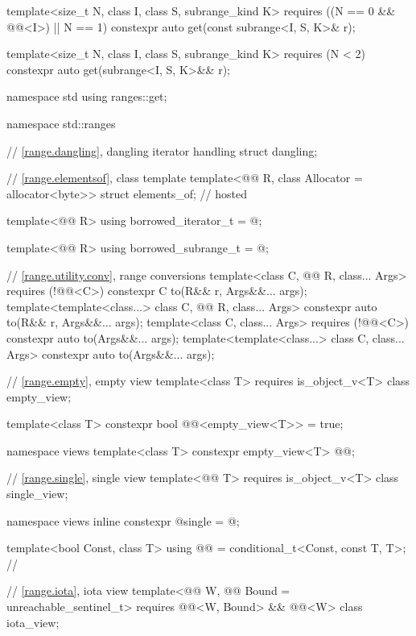 \begin{codeblock}
{  template<size_t N, class I, class S, subrange_kind K>
    requires ((N == 0 && @@<I>) || N == 1)
    constexpr auto get(const subrange<I, S, K>& r);

  template<size_t N, class I, class S, subrange_kind K>
    requires (N < 2)
    constexpr auto get(subrange<I, S, K>&& r);
}

namespace std {
  using ranges::get;
}

namespace std::ranges {
  // \ref{range.dangling}, dangling iterator handling
  struct dangling;

  // \ref{range.elementsof}, class template 
  template<@@ R, class Allocator = allocator<byte>>
    struct elements_of;                                                             // hosted

  template<@@ R>
    using borrowed_iterator_t = @\seebelow@;

  template<@@ R>
    using borrowed_subrange_t = @\seebelow@;

  // \ref{range.utility.conv}, range conversions
  template<class C, @@ R, class... Args> requires (!@@<C>)
    constexpr C to(R&& r, Args&&... args);
  template<template<class...> class C, @@ R, class... Args>
    constexpr auto to(R&& r, Args&&... args);
  template<class C, class... Args> requires (!@@<C>)
    constexpr auto to(Args&&... args);
  template<template<class...> class C, class... Args>
    constexpr auto to(Args&&... args);

  // \ref{range.empty}, empty view
  template<class T>
    requires is_object_v<T>
  class empty_view;

  template<class T>
    constexpr bool @@<empty_view<T>> = true;

  namespace views {
    template<class T>
      constexpr empty_view<T> @@{};
  }

  // \ref{range.single}, single view
  template<@@ T>
    requires is_object_v<T>
  class single_view;

  namespace views { inline constexpr @\unspecnc@ single = @\unspecnc@; }

  template<bool Const, class T>
    using @@ = conditional_t<Const, const T, T>;   // \expos

  // \ref{range.iota}, iota view
  template<@@ W, @@ Bound = unreachable_sentinel_t>
    requires @@<W, Bound> && @@<W>
  class iota_view;

}
\end{codeblock}
